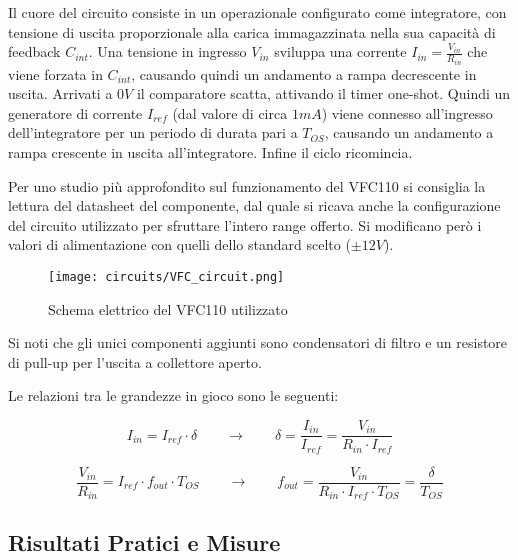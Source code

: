 Il cuore del circuito consiste in un operazionale configurato come integratore, con tensione
di uscita proporzionale alla carica immagazzinata nella sua capacità di feedback $C_{int}$.
Una tensione in ingresso $V_{in}$ sviluppa una corrente $I_{in}=\frac{V_{in}}{R_{in}}$
che viene forzata in $C_{int}$, causando quindi un andamento a rampa decrescente in uscita.
Arrivati a $0V$ il comparatore scatta, attivando il timer one-shot. Quindi un generatore
di corrente $I_{ref}$ (dal valore di circa $1mA$) viene connesso all'ingresso dell'integratore
per un periodo di durata pari a $T_{OS}$, causando un andamento a rampa crescente in uscita
all'integratore. Infine il ciclo ricomincia.


Per uno studio più approfondito sul funzionamento del VFC110 si consiglia la lettura del
datasheet del componente, dal quale si ricava anche la configurazione del circuito utilizzato
per sfruttare l'intero range offerto. Si modificano però i valori di alimentazione con
quelli dello standard scelto ($\pm 12V$).
\medskip

\begin{figure}[ht]
    \centering
    \texttt{[image: circuits/VFC\_circuit.png]}
    \caption{Schema elettrico del VFC110 utilizzato}
    \label{VFC_circuit}
\end{figure}

Si noti che gli unici componenti aggiunti sono condensatori di filtro e un resistore di
pull-up per l'uscita a collettore aperto.

Le relazioni tra le grandezze in gioco sono le seguenti:

\begin{displaymath}
    I_{in}=I_{ref}\cdot\delta
    \qquad
    \rightarrow
    \qquad
    \delta=\frac{I_{in}}{I_{ref}}=\frac{V_{in}}{R_{in}\cdot I_{ref}}
\end{displaymath}

\begin{displaymath}
    \frac{V_{in}}{R_{in}}=I_{ref}\cdot f_{out}\cdot T_{OS}
    \qquad
    \rightarrow
    \qquad
    f_{out}=\frac{V_{in}}{R_{in}\cdot I_{ref}\cdot T_{OS}}=\frac{\delta}{T_{OS}}
\end{displaymath}


\subsection*{Risultati Pratici e Misure}

